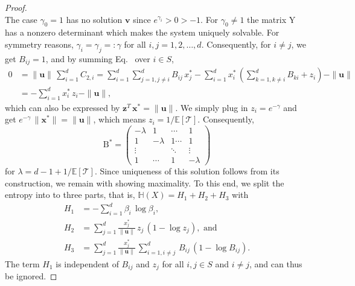 \documentclass[smallextended]{svjour3}
\makeatletter
\renewcommand*{\eqref}[1]{%
  \hyperref[{#1}]{\textup{\tagform@{\ref*{#1}}}}%
}
\renewcommand{\tens}[1]{\mathrm{#1}}
\renewcommand{\vec}[1]{\mathbf{#1}}
\newcommand{\E}{\mathbb{E}}
\newcommand{\TT}{\mathcal{T}}
\renewcommand{\H}{\mathbb{H}}
\newcommand{\suml}{\sum\limits}
\newcommand{\vnorms}[1]{\|#1\|}
\newcommand{\ie}{that is}
\makeatother
\begin{document}
\begin{proof}
\begin{equation}
		\end{equation}
		The case $\gamma_0=1$ has no solution $\vec{v}$ since $e^{\gamma_i}>0>-1$.
		For $\gamma_0\neq 1$ the matrix $\tens{Y}$ has a nonzero determinant which makes the system uniquely solvable.
		For symmetry reasons, $\gamma_i=\gamma_j=:\gamma$ for all $i,j=1,2,\ldots,d$.
		Consequently, for $i\neq j$, we get $B_{ij}=1$, and by summing Eq.~\eqref{eqn:constraint_C2} over $i\in S$,
		\begin{equation}
		\begin{aligned}
			0 &= \vnorms{\vec{u}}\,\suml_{i=1}^d C_{2,i} = \suml_{i=1}^d \suml_{j=1,j\neq i}^d B_{ij}\,x_j^\ast - \suml_{i=1}^d x_i^\ast\,\left(\suml_{k=1,k\neq i}^d B_{ki}+z_i\right) - \vnorms{\vec{u}}\\
			&= -\suml_{i=1}^d x_i^\ast\,z_i - \vnorms{\vec{u}},		
		\end{aligned}
		\end{equation}
		which can also be expressed by $\vec{z}^T\,\vec{x}^\ast = \vnorms{\vec{u}}$.
		We simply plug in $z_i=e^{-\gamma}$ and get $e^{-\gamma}\,\vnorms{\vec{x}^\ast} = \|\vec{u}\|$, which means $z_i = 1/\E\left[\TT\right]$.
		Consequently,
		\begin{equation}
			\tens{B}^\ast = \begin{pmatrix}
									-\lambda & 1 & \cdots & 1\\
									1 & -\lambda & 1 \cdots & 1 \\
									\vdots & & \ddots & \vdots\\
									1 & \cdots & 1 & -\lambda
							\end{pmatrix}
		\end{equation}
		for $\lambda=d-1+1/\E\left[\TT\right]$.
		Since uniqueness of this solution follows from its construction, we remain with showing maximality.
		To this end, we split the entropy into to three parts, \ie, $\H(X) = H_1 + H_2 + H_3$ with
		\begin{equation}
			\begin{aligned}
				H_1 &= -\suml_{i=1}^d\beta_i\,\log\beta_i,\\
				H_2 &= \suml_{j=1}^d \frac{x^\ast_j}{\vnorms{\vec{u}}}\,z_j\,(1-\log z_j), \text{ and}\\
				H_3 &= \suml_{j=1}^d \frac{x^\ast_j}{\vnorms{\vec{u}}}\,\suml_{i=1,i\neq j}^d \,B_{ij}\,(1-\log B_{ij}).
			\end{aligned}
		\end{equation}
		The term $H_1$ is independent of $B_{ij}$ and $z_j$ for all $i,j\in S$ and $i\neq j$, and can thus be ignored.

\end{proof}
\end{document}
